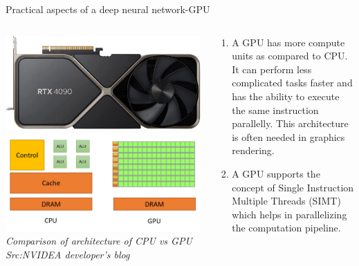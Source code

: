 \begin{frame}{Practical aspects of a deep neural network-GPU}
	\begin{columns}[T]
        \begin{column}{0.4\textwidth}
        	\includegraphics[width=\textwidth]{images/RTX.jpg}
			\includegraphics[width=\textwidth]{images/GPUvsCPU.png}
			\tiny{\textit{Comparison of architecture of CPU vs GPU\\ Src:NVIDEA developer's blog}}
        \end{column}
	    \begin{column}{0.6\textwidth} 
			\begin{enumerate}[$\bullet$]
				\item A GPU has more compute units as compared to CPU. It can perform less complicated tasks faster and has the ability to execute the same instruction parallelly. This architecture is often needed in graphics rendering.
				\item A GPU supports the concept of Single Instruction Multiple
				Threads (SIMT) which helps in parallelizing the computation pipeline.
			\end{enumerate}
    	\end{column}
    \end{columns}
\end{frame}

